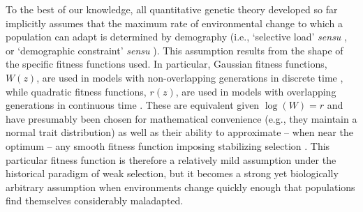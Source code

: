 \documentclass[12pt,letterpaper]{article} %
\begin{document}
To the best of our knowledge, all quantitative genetic theory developed so far implicitly assumes that the maximum rate of environmental change to which a population can adapt is determined by demography (i.e., `selective load' \textit{sensu} \citealt{Lynch1993}, or `demographic constraint' \textit{sensu} \citealt{Gomulkiewicz2009}). 
This assumption results from the shape of the specific fitness functions used.
In particular, Gaussian fitness functions, $W(z)$, are used in models with non-overlapping generations in discrete time \citep{Charlesworth1993c,Burger1995,Burger1997,Burger1999a,Gomulkiewicz2009,Chevin2010,Matuszewski2015,Marshall2016}, while quadratic fitness functions, $r(z)$, are used in models with overlapping generations in continuous time \citep{Pease1989,Lynch1991,Lynch1993,Polechova2009,Aguilee2016}.
These are equivalent given $\log(W)=r$ \citep[][Chapter 1]{Crow1970} and have presumably been chosen for mathematical convenience (e.g., they maintain a normal trait distribution) as well as their ability to approximate -- when near the optimum -- any smooth fitness function imposing stabilizing selection \citep[][]{Lande1976}.
This particular fitness function is therefore a relatively mild assumption under the historical paradigm of weak selection, but it becomes a strong yet biologically arbitrary assumption when environments change quickly enough that populations find themselves considerably maladapted.
\end{document}
